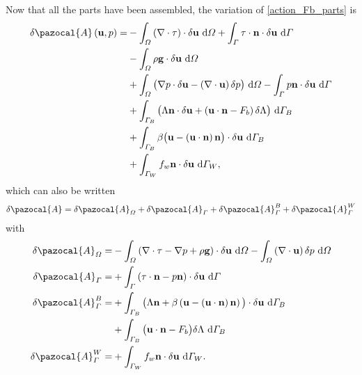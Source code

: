 Now that all the parts have been assembled, the variation of \cref{action_Fb_parts} is
\begin{align*}
  \delta \pazocal{A} \left(\mathbf{u}, p\right) =
  &- \int_{\Omega} \left( \nabla \cdot \tau \right) \cdot \delta \mathbf{u} \d{\Omega} + \int_{\Gamma} \tau \cdot \mathbf{n} \cdot \delta \mathbf{u} \d{\Gamma} \\
  &- \int_{\Omega} \rho \mathbf{g} \cdot \delta \mathbf{u} \d{\Omega} \\
  &+ \int_{\Omega} \big( \nabla p \cdot \delta \mathbf{u} - \left( \nabla \cdot \mathbf{u} \right) \delta p  \big) \d{\Omega} - \int_{\Gamma} p \mathbf{n} \cdot \delta \mathbf{u} \d{\Gamma} \\
  &+ \int_{\Gamma_B} \big( \Lambda \mathbf{n} \cdot \delta \mathbf{u} + \left( \mathbf{u} \cdot \mathbf{n} - F_b \right) \delta \Lambda \big) \d{\Gamma_B} \\
  &+ \int_{\Gamma_B} \beta \big( \mathbf{u} - \left( \mathbf{u} \cdot \mathbf{n} \right) \mathbf{n} \big) \cdot \delta \mathbf{u} \d{\Gamma_B} \\
  &+ \int_{\Gamma_W} f_w \mathbf{n} \cdot \delta \mathbf{u} \d{\Gamma_W},
\end{align*}
which can also be written
\begin{align}
  \label{action_variation_Fb}
  \delta \pazocal{A} =
    \delta \pazocal{A}_{\Omega} 
  + \delta \pazocal{A}_{\Gamma} 
  + \delta \pazocal{A}_{\Gamma}^B 
  + \delta \pazocal{A}_{\Gamma}^W 
\end{align}
with
\begin{align*}
  \delta \pazocal{A}_{\Omega}   = &- \int_{\Omega} \left( \nabla \cdot \tau - \nabla p + \rho \mathbf{g} \right) \cdot \delta \mathbf{u} \d{\Omega} - \int_{\Omega} \left( \nabla \cdot \mathbf{u} \right) \delta p \d{\Omega} \\ 
  \delta \pazocal{A}_{\Gamma}   = &+ \int_{\Gamma} \left( \tau \cdot \mathbf{n} - p \mathbf{n} \right) \cdot \delta \mathbf{u} \d{\Gamma} \\
  \delta \pazocal{A}_{\Gamma}^B = &+ \int_{\Gamma_B} \big( \Lambda \mathbf{n} + \beta \left( \mathbf{u} - \left( \mathbf{u} \cdot \mathbf{n} \right) \mathbf{n} \right) \big) \cdot \delta \mathbf{u} \d{\Gamma_B} \\
  &+ \int_{\Gamma_B} \big( \mathbf{u} \cdot \mathbf{n} - F_b \big) \delta \Lambda \d{\Gamma_B} \\
  \delta \pazocal{A}_{\Gamma}^W = &+ \int_{\Gamma_W} f_w \mathbf{n} \cdot \delta \mathbf{u} \d{\Gamma_W}.
\end{align*}
